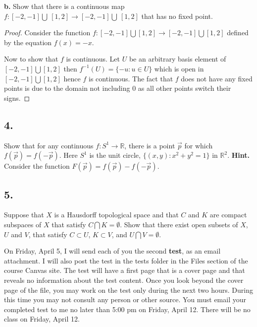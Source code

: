\documentclass{amsart}
\theoremstyle{plain}
\theoremstyle{definition}
\theoremstyle{remark}
\begin{document}
\vspace{.1in}
{\bfseries b.} Show that there is a continuous map $f : [-2, -1] \bigcup  \ [1,2] \rightarrow [-2, -1] \bigcup \ [1,2]$ that has no fixed point.  

\begin{proof}
    Consider the function $f:[-2,-1]\bigcup [1,2]\to [-2,-1]\bigcup [1,2]$ defined by the equation $f(x)=-x$. 

    Now to show that $f$ is continuous. Let $U$ be an arbitrary basis element of $[-2,-1]\bigcup [1,2]$ then $f^{-1}(U)=\{-u:u\in U\}$ which is open in $[-2,-1]\bigcup [1,2]$ hence $f$ is continuous. The fact that $f$ does not have any fixed points is due to the domain not including $0$ as all other points switch their signs. 
\end{proof}

\vspace{.15in}
\noindent
\subsection*{4.} Show that for any continuous $f : S^1 \rightarrow \mathbb R$, there is a point $\vec{p}$ for which $f(\vec{p}) = f(-\vec{p})$. Here $S^1$ is the unit circle, $\{ (x,y) : x^2 + y^2 = 1\}$ in $\mathbb R ^2$. {\bfseries Hint.} Consider the function $F(\vec{p}) = f(\vec{p}) - f(-\vec{p})$.





\vspace{.15in}
\noindent
\subsection*{5.} Suppose that $X$ is a Hausdorff topological space and that $C$ and $K$ are compact subspaces of $X$ that satisfy $C\bigcap K = \emptyset$. Show that there exist open subsets of $X$, $U$ and $V$, that satisfy $C\subset U$, $K\subset V$, and $U\bigcap V = \emptyset$.

\vspace{.45in}
On Friday, April 5, I will send each of you the second {\bfseries test}, as an email attachment. I will also post the test in the tests folder in the Files section of the course Canvas site. The test will have a first page that is a cover page and that reveals no information about the test content.   Once you look beyond the cover page of the file, you may work on the test only during the next two hours.  During this time you may not consult any person or other source.  You must email your completed test to me 
no later than 5:00 pm on Friday, April 12.  There will be no class 
on Friday, April 12.  
\end{document}
